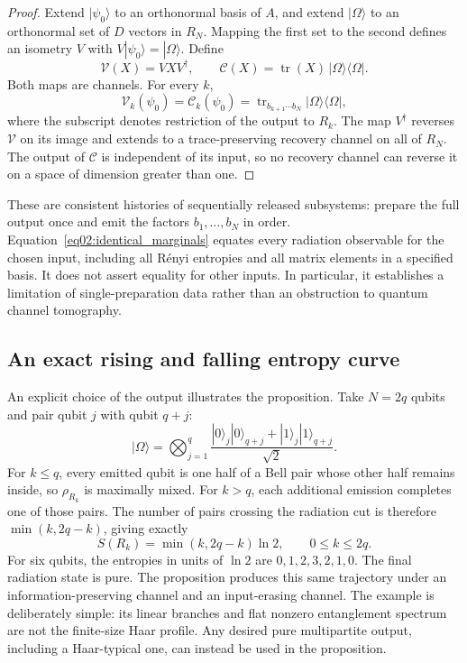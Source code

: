 \documentclass[11pt,letterpaper]{article}
\theoremstyle{plain}
\theoremstyle{definition}
\theoremstyle{remark}
\newcommand{\Ccal}{\mathcal{C}}
\newcommand{\Vcal}{\mathcal{V}}
\DeclareMathOperator{\tr}{tr}
\begin{document}
\begin{proof}
Extend $|\psi_0\rangle$ to an orthonormal basis of $A$, and extend
$|\Omega\rangle$ to an orthonormal set of $D$ vectors in $R_N$. Mapping
the first set to the second defines an isometry $V$ with
$V|\psi_0\rangle=|\Omega\rangle$. Define
\begin{equation}
 \Vcal(X)=VXV^\dagger,\qquad
 \Ccal(X)=\tr(X)\,|\Omega\rangle\langle\Omega|.
 \label{eq02:two_channels}
\end{equation}
Both maps are channels. For every $k$,
\begin{equation}
 \Vcal_k(\psi_0)=\Ccal_k(\psi_0)
 =\tr_{b_{k+1}\cdots b_N}|\Omega\rangle\langle\Omega|,
 \label{eq02:identical_marginals}
\end{equation}
where the subscript denotes restriction of the output to $R_k$.
The map $V^\dagger$ reverses $\Vcal$ on its image and extends to a
trace-preserving recovery channel on all of $R_N$. The output of
$\Ccal$ is independent of its input, so no recovery channel can reverse
it on a space of dimension greater than one.
\end{proof}

These are consistent histories of sequentially released subsystems:
prepare the full output once and emit the factors $b_1,\ldots,b_N$ in
order. Equation~\eqref{eq02:identical_marginals} equates every radiation
observable for the chosen input, including all R\'enyi entropies and
all matrix elements in a specified basis. It does not assert equality for
other inputs. In particular, it establishes a limitation of
single-preparation data rather than an obstruction to quantum channel
tomography.

\subsection{An exact rising and falling entropy curve}
\label{subsec02:bell_example}

An explicit choice of the output illustrates the proposition. Take
$N=2q$ qubits and pair qubit $j$ with qubit $q+j$:
\begin{equation}
 |\Omega\rangle
 =\bigotimes_{j=1}^{q}
 \frac{|0\rangle_j|0\rangle_{q+j}
       +|1\rangle_j|1\rangle_{q+j}}{\sqrt2}.
 \label{eq02:bell_output}
\end{equation}
For $k\leq q$, every emitted qubit is one half of a Bell pair whose
other half remains inside, so $\rho_{R_k}$ is maximally mixed. For
$k>q$, each additional emission completes one of those pairs. The
number of pairs crossing the radiation cut is therefore
$\min(k,2q-k)$, giving exactly
\begin{equation}
 S(R_k)=\min(k,2q-k)\ln2,\qquad 0\leq k\leq2q.
 \label{eq02:bell_curve}
\end{equation}
For six qubits, the entropies in units of $\ln2$ are
$0,1,2,3,2,1,0$. The final radiation state is pure. The proposition
produces this same trajectory under an information-preserving channel
and an input-erasing channel. The example is deliberately simple: its
linear branches and flat nonzero entanglement spectrum are not the
finite-size Haar profile. Any desired pure multipartite output,
including a Haar-typical one, can instead be used in the proposition.
\end{document}
